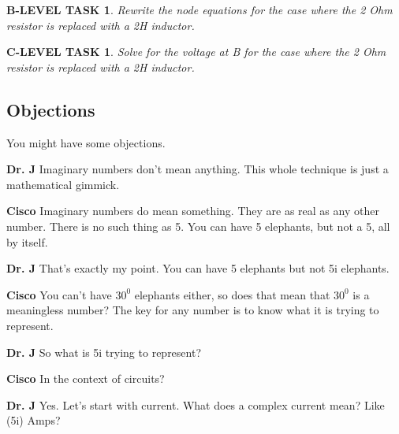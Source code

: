 \documentclass{book}
\numberwithin{equation}{section}
\newtheorem{blevel}{B-LEVEL TASK}
\newtheorem{clevel}{C-LEVEL TASK}
\theoremstyle{definition}
\begin{document}
\begin{blevel}
Rewrite the node equations for the case where the 2 Ohm resistor is replaced with a 2H inductor.
\end{blevel}

\begin{clevel}
Solve for the voltage at B for the case where the 2 Ohm resistor is replaced with a 2H inductor.
\end{clevel}

\subsection{Objections}
You might have some objections.\par
\vspace{6pt}
\setlength{\hangindent}{30pt}
\noindent \textbf{Dr. J}
Imaginary numbers don't mean anything. This whole technique is just a mathematical gimmick.\par
\vspace{6pt}
\setlength{\hangindent}{30pt} \noindent \textbf{Cisco}
Imaginary numbers do mean something. They are as real as any other number. There is no such thing as 5. You can have 5 elephants, but not a 5, all by itself.\par
\vspace{6pt}

\setlength{\hangindent}{30pt}\noindent \textbf{Dr. J}
That's exactly my point. You can have 5 elephants but not 5i elephants.\par
\vspace{6pt}

\setlength{\hangindent}{30pt}\noindent \textbf{Cisco}
You can't have $30^0$ elephants either, so does that mean that $30^0$ is a meaningless number? The key for any number is to know what it is trying to represent.\par
\vspace{6pt}

\setlength{\hangindent}{30pt}\noindent \textbf{Dr. J}
So what is 5i trying to represent?\par
\vspace{6pt}

\setlength{\hangindent}{30pt}\noindent \textbf{Cisco}
In the context of circuits?\par
\vspace{6pt}

\setlength{\hangindent}{30pt}\noindent \textbf{Dr. J}
Yes. Let's start with current. What does a complex current mean? Like (5i) Amps?\par
\vspace{6pt}
\end{document}
